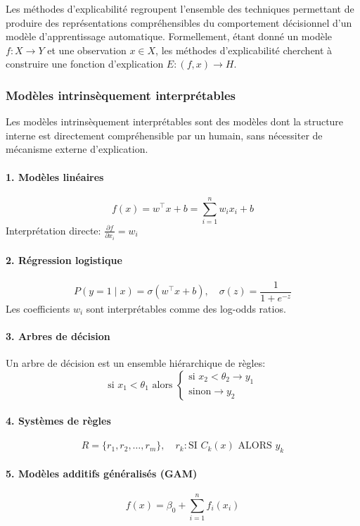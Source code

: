 Les méthodes d’explicabilité regroupent l’ensemble des techniques permettant de produire des représentations compréhensibles du comportement décisionnel d’un modèle d’apprentissage automatique. Formellement, étant donné un modèle $f: X \rightarrow Y$ et une observation $x \in X$, les méthodes d’explicabilité cherchent à construire une fonction d’explication $E: (f, x) \rightarrow H$.

\subsubsection{Modèles intrinsèquement interprétables}

Les modèles intrinsèquement interprétables sont des modèles dont la structure interne est directement compréhensible par un humain, sans nécessiter de mécanisme externe d’explication.

\paragraph{1. Modèles linéaires}
\[
f(x) = w^\top x + b = \sum_{i=1}^{n} w_i x_i + b
\]
Interprétation directe: $\frac{\partial f}{\partial x_i} = w_i$

\paragraph{2. Régression logistique}
\[
P(y=1 \mid x) = \sigma(w^\top x + b), \quad \sigma(z) = \frac{1}{1 + e^{-z}}
\]
Les coefficients $w_i$ sont interprétables comme des log-odds ratios.

\paragraph{3. Arbres de décision}
Un arbre de décision est un ensemble hiérarchique de règles:
\[
\text{si } x_1 < \theta_1 \text{ alors } \begin{cases} \text{si } x_2 < \theta_2 \rightarrow y_1 \\ \text{sinon} \rightarrow y_2 \end{cases}
\]

\paragraph{4. Systèmes de règles}
\[
R = \{ r_1, r_2, \dots, r_m \}, \quad r_k : \text{SI } C_k(x) \text{ ALORS } y_k
\]

\paragraph{5. Modèles additifs généralisés (GAM)}
\[
f(x) = \beta_0 + \sum_{i=1}^{n} f_i(x_i)
\]

